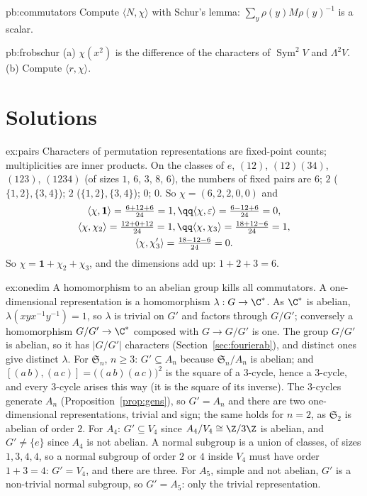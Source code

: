 \begin{hint}{pb:commutators}
Compute $\langle N,\chi\rangle$ with Schur's lemma: $\sum_y\rho(y)M\rho(y)^{-1}$ is a scalar.
\end{hint}

\begin{hint}{pb:frobschur}
(a) $\chi(x^2)$ is the difference of the characters of $\operatorname{Sym}^2V$ and $\Lambda^2V$. (b) Compute $\langle r,\chi\rangle$.
\end{hint}

\section{Solutions}

\begin{solution}{ex:pairs}
\idea Characters of permutation representations are fixed-point counts; multiplicities are inner products.
\writeup On the classes of $e$, $(12)$, $(12)(34)$, $(123)$, $(1234)$ (of sizes $1$, $6$, $3$, $8$, $6$), the numbers of fixed pairs are $6$; $2$ ($\{1,2\},\{3,4\}$); $2$ ($\{1,2\},\{3,4\}$); $0$; $0$. So $\chi=(6,2,2,0,0)$ and
\[
\begin{gathered}
\langle\chi,\mathbf1\rangle=\tfrac{6+12+6}{24}=1,\qq\langle\chi,\varepsilon\rangle=\tfrac{6-12+6}{24}=0,\\
\langle\chi,\chi_2\rangle=\tfrac{12+0+12}{24}=1,\qq\langle\chi,\chi_3\rangle=\tfrac{18+12-6}{24}=1,\\
\langle\chi,\chi_3'\rangle=\tfrac{18-12-6}{24}=0.
\end{gathered}
\]
So $\chi=\mathbf1+\chi_2+\chi_3$, and the dimensions add up: $1+2+3=6$.
\end{solution}

\begin{solution}{ex:onedim}
\idea A homomorphism to an abelian group kills all commutators.
\writeup A one-dimensional representation is a homomorphism $\lambda:G\to\C^*$. As $\C^*$ is abelian, $\lambda(xyx^{-1}y^{-1})=1$, so $\lambda$ is trivial on $G'$ and factors through $G/G'$; conversely a homomorphism $G/G'\to\C^*$ composed with $G\to G/G'$ is one. The group $G/G'$ is abelian, so it has $|G/G'|$ characters (Section~\ref{sec:fourierab}), and distinct ones give distinct $\lambda$. For $\mathfrak S_n$, $n\ge3$: $G'\subseteq A_n$ because $\mathfrak S_n/A_n$ is abelian; and $[(a\,b),(a\,c)]=\bigl((a\,b)(a\,c)\bigr)^2$ is the square of a $3$-cycle, hence a $3$-cycle, and every $3$-cycle arises this way (it is the square of its inverse). The $3$-cycles generate $A_n$ (Proposition~\ref{prop:gens}), so $G'=A_n$ and there are two one-dimensional representations, trivial and sign; the same holds for $n=2$, as $\mathfrak S_2$ is abelian of order $2$. For $A_4$: $G'\subseteq V_4$ since $A_4/V_4\cong\Z/3\Z$ is abelian, and $G'\ne\{e\}$ since $A_4$ is not abelian. A normal subgroup is a union of classes, of sizes $1,3,4,4$, so a normal subgroup of order $2$ or $4$ inside $V_4$ must have order $1+3=4$: $G'=V_4$, and there are three. For $A_5$, simple and not abelian, $G'$ is a non-trivial normal subgroup, so $G'=A_5$: only the trivial representation.
\end{solution}

